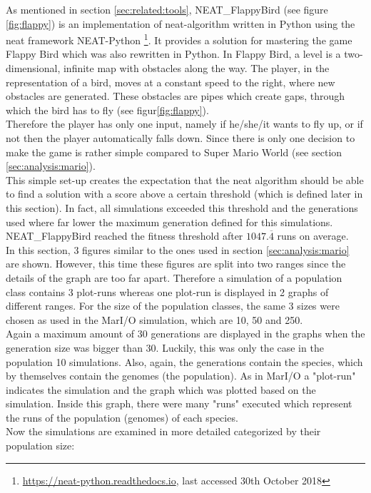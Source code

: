 		As mentioned in section \ref{sec:related:tools}, NEAT\_FlappyBird (see figure \ref{fig:flappy}) is an implementation of \gls{neat}-algorithm written in Python using the \gls{neat} framework NEAT-Python \footnote{\url{https://neat-python.readthedocs.io}, last accessed 30th October 2018}. It provides a solution for mastering the game Flappy Bird which was also rewritten in Python. In Flappy Bird, a level is a two-dimensional, infinite map with obstacles along the way. The player, in the representation of a bird, moves at a constant speed to the right, where new obstacles are generated. These obstacles are pipes which create gaps, through which the bird has to fly (see figur\ref{fig:flappy}). \\
		Therefore the player has only one input, namely if he/she/it wants to fly up, or if not then the player automatically falls down. Since there is only one decision to make the game is rather simple compared to Super Mario World (see section \ref{sec:analysis:mario}).\\
		This simple set-up creates the expectation that the \gls{neat} algorithm should be able to find a solution with a score above a certain threshold (which is defined later in this section). In fact, all simulations exceeded this threshold and the generations used where far lower the maximum generation defined for this simulations. NEAT\_FlappyBird reached the fitness threshold after $1047.\overline{4}$ runs on average. \\
		In this section, 3 figures similar to the ones used in section \ref{sec:analysis:mario} are shown. However, this time these figures are split into two ranges since the details of the graph are too far apart. Therefore a simulation of a population class contains 3 plot-runs whereas one plot-run is displayed in 2 graphs of different ranges.  For the size of the population classes, the same 3 sizes were chosen as used in the MarI/O simulation, which are 10, 50 and 250. \\
		Again a maximum amount of 30 generations are displayed in the graphs when the generation size was bigger than 30. Luckily, this was only the case in the population 10 simulations. Also, again, the generations contain the species, which by themselves contain the genomes (the population). 
		As in MarI/O a "plot-run" indicates the simulation and the graph which was plotted based on the simulation. Inside this graph, there were many "runs" executed which represent the runs of the population (genomes) of each species. \\
		Now the simulations are examined in more detailed categorized by their population size:
		
